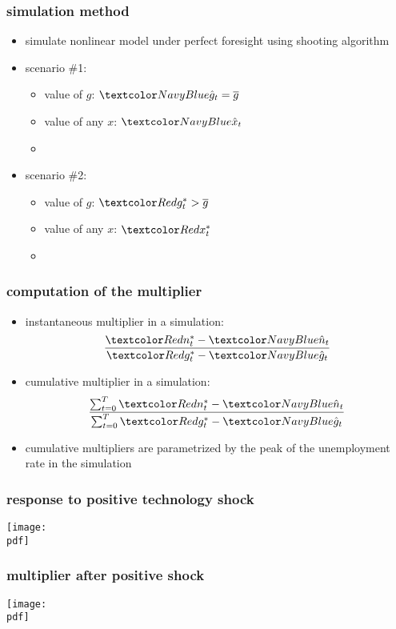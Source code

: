\documentclass[12pt,xcolor={dvipsnames},hyperref={pdftex,pdfpagemode=UseNone,hidelinks,pdfdisplaydoctitle=true},usepdftitle=false]{beamer}
\def\pdf{xmultiplier.pdf}
\begin{document}
\begin{frame}
\frametitle{simulation method}
\begin{itemize}
\item simulate nonlinear model under perfect foresight using shooting algorithm
\item scenario \#1: 
\begin{itemize}
\item value of $g$: $\bal{\hat{g}_{t} = \ol{g}}$
\item value of any $x$: $\bal{\hat{x}_{t}}$
\item {}
\end{itemize}
\item scenario \#2: 
\begin{itemize}
\item value of $g$: $\ral{g^{*}_{t}>\ol{g}}$
\item value of any $x$: $\ral{x^{*}_{t}}$
\item {}
\end{itemize}
\end{itemize}
\end{frame}


\begin{frame}
\frametitle{computation of the multiplier}
\begin{itemize}
\item instantaneous multiplier in a simulation:
\begin{equation*}
\frac{\ral{n^{*}_{t}}-\bal{\hat{n}_{t}}}{\ral{g^{*}_{t}}-\bal{\hat{g}_{t}}}
\end{equation*}
\item cumulative multiplier in a simulation:
\begin{equation*}
\frac{\sum_{t=0}^{T}\ral{n^{*}_{t}}-\bal{\hat{n}_{t}}}{\sum_{t=0}^{T} \ral{g^{*}_{t}}-\bal{\hat{g}_{t}}}
\end{equation*}
\item cumulative multipliers are parametrized by the peak of the unemployment rate in the
simulation
\end{itemize}
\end{frame}

\begin{frame}
\frametitle{response to positive technology shock}
\texttt{[image: \\pdf]}%
\end{frame}

\begin{frame}
\frametitle{multiplier after positive shock}
\texttt{[image: \\pdf]}%
\end{frame}
\end{document}

